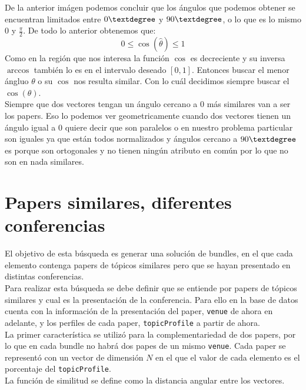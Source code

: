 De la anterior imágen podemos concluir que los ángulos que podemos obtener se encuentran limitados entre $0 \textdegree$ y $90 \textdegree$, o lo que es lo mismo $0$ y $\frac{\pi}{2}$. De todo lo anterior obtenemos que:
$$0\leq \cos(\hat{\theta}) \leq 1$$
Como en la región que nos interesa la función $\cos$ es decreciente y su inversa $\arccos$ también lo es en el intervalo deseado $[0, 1]$. Entonces buscar el menor ángluo $\theta$ o su $\cos$ nos resulta similar. Con lo cuál decidimos siempre buscar el $\cos(\theta)$.\\
Siempre que dos vectores tengan un ángulo cercano a $0$ más similares van a ser los papers. Eso lo podemos ver geometricamente cuando dos vectores tienen un ángulo igual a $0$ quiere decir que son paralelos o en nuestro problema particular son iguales ya que están todos normalizados y ángulos cercano a $90 \textdegree$ es porque son ortogonales y no tienen ningún atributo en común por lo que no son en nada similares.
\section{Papers similares, diferentes conferencias}\label{bus:papSimDisLug}
El objetivo de esta búsqueda es generar una solución de bundles, en el que cada elemento contenga 
papers de tópicos similares pero que se hayan presentado en distintas conferencias.\\
Para realizar esta búsqueda se debe definir que se entiende por papers de tópicos similares y cual 
es la presentación de la conferencia. Para ello en la base de datos \cite{dataDrive} cuenta 
con la información de la presentación del paper, \texttt{venue} de ahora en adelante, y los 
perfiles de cada paper, \texttt{topicProfile} a partir de ahora.\\
La primer característica se utilizó para la complementariedad de dos papers, por lo que en cada 
bundle no habrá dos papes de un mismo \texttt{venue}. Cada paper se representó
con un vector de dimensión $N$ en el que el valor de cada elemento es el porcentaje del \texttt{topicProfile}.\\ 
La función de similitud se define como la distancia angular entre los vectores.
%
